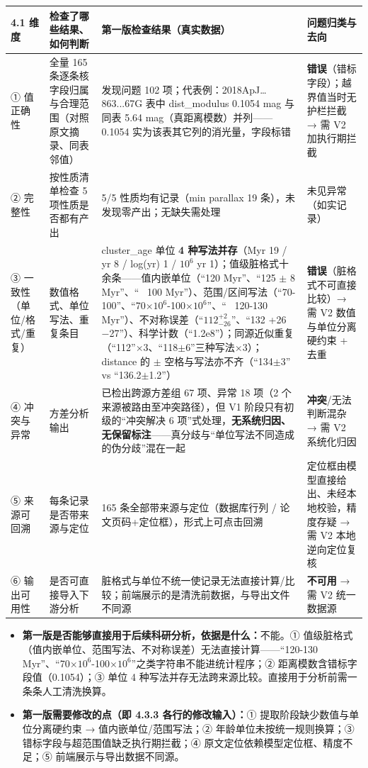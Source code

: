 \begin{longtable}{@{}p{1.9cm}p{3.1cm}p{6.4cm}p{3.4cm}@{}}
\toprule
4.1 维度 & 检查了哪些结果、如何判断 & 第一版检查结果（真实数据） & 问题归类与去向 \\
\midrule
① 值正确性 & 全量 165 条逐条核字段归属与合理范围（对照原文摘录、同表邻值） & 发现问题 102 项；代表例：2018ApJ…863...67G 表中 dist\_modulus 0.1054 mag 与同表 5.64 mag（真距离模数）并列——0.1054 实为该表其它列的消光量，字段标错 & \textbf{错误}（错标字段）；越界值当时无护栏拦截 → 需 V2 加执行期拦截 \\
② 完整性 & 按性质清单检查 5 项性质是否都有产出 & 5/5 性质均有记录（min parallax 19 条），未发现零产出；无缺失需处理 & 未见异常（如实记录） \\
③ 一致性（单位/格式/重复） & 数值格式、单位写法、重复条目 & cluster\_age 单位 \textbf{4 种写法并存}（Myr 19 / yr 8 / log(yr) 1 / $10^{6}$ yr 1）；值级脏格式十余条——值内嵌单位（“120 Myr”、“125 $\pm$ 8 Myr”、“~ 100 Myr”）、范围/区间写法（“70-100”、“70$\times10^{6}$-100$\times10^{6}$”、“~ 120-130 Myr”）、不对称误差（“$112^{+2}_{-26}$”、“132 +26 $-$27”）、科学计数（“1.2e8”）；同源近似重复（“112”$\times$3、“118$\pm$6”三种写法$\times$3）；distance 的 $\pm$ 空格与写法亦不齐（“134$\pm$3” vs “136.2$\pm$1.2”） & \textbf{错误}（脏格式不可直接比较）→ 需 V2 数值与单位分离硬约束 + 去重 \\
④ 冲突与异常 & 方差分析输出 & 已检出跨源方差组 67 项、异常 18 项（2 个来源被路由至冲突路径），但 V1 阶段只有初级的“冲突解决 6 项”式处理，\textbf{无系统归因、无保留标注}——真分歧与“单位写法不同造成的伪分歧”混在一起 & \textbf{冲突}/无法判断混杂 → 需 V2 系统化归因 \\
⑤ 来源可回溯 & 每条记录是否带来源与定位 & 165 条全部带来源与定位（数据库行列 / 论文页码+定位框），形式上可点击回溯 & 定位框由模型直接给出、未经本地校验，精度存疑 → 需 V2 本地逆向定位复核 \\
⑥ 输出可用性 & 是否可直接导入下游分析 & 脏格式与单位不统一使记录无法直接计算/比较；前端展示的是清洗前数据，与导出文件不同源 & \textbf{不可用} → 需 V2 统一数据源 \\
\bottomrule
\end{longtable}

\begin{itemize}[leftmargin=1.2em,itemsep=2pt]
\item \textbf{第一版是否能够直接用于后续科研分析，依据是什么：}不能。① 值级脏格式（值内嵌单位、范围写法、不对称误差）无法直接计算——“120-130 Myr”、“70$\times10^{6}$-100$\times10^{6}$”之类字符串不能进统计程序；② 距离模数含错标字段值（0.1054）；③ 单位 4 种写法并存无法跨来源比较。直接用于分析前需一条条人工清洗换算。
\item \textbf{第一版需要修改的点（即 4.3.3 各行的修改输入）：}① 提取阶段缺少数值与单位分离硬约束 → 值内嵌单位/范围写法；② 年龄单位未按统一规则换算；③ 错标字段与超范围值缺乏执行期拦截；④ 原文定位依赖模型定位框、精度不足；⑤ 前端展示与导出数据不同源。
\end{itemize}

